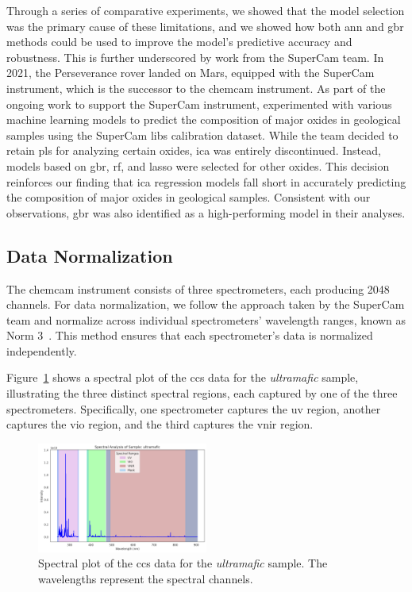 Through a series of comparative experiments, we showed that the model selection was the primary cause of these limitations, and we showed how both \gls{ann} and \gls{gbr} methods could be used to improve the model's predictive accuracy and robustness.
This is further underscored by work from the SuperCam team.
In 2021, the Perseverance rover landed on Mars, equipped with the SuperCam instrument, which is the successor to the \gls{chemcam} instrument.
As part of the ongoing work to support the SuperCam instrument, \citet{andersonPostlandingMajorElement2022} experimented with various machine learning models to predict the composition of major oxides in geological samples using the SuperCam \gls{libs} calibration dataset.
While the team decided to retain \gls{pls} for analyzing certain oxides, \gls{ica} was entirely discontinued.
Instead, models based on \gls{gbr}, \gls{rf}, and \gls{lasso} were selected for other oxides.
This decision reinforces our finding that \gls{ica} regression models fall short in accurately predicting the composition of major oxides in geological samples.
Consistent with our observations, \gls{gbr} was also identified as a high-performing model in their analyses.

\subsection{Data Normalization}\label{sec:data_normalization}
The \gls{chemcam} instrument consists of three spectrometers, each producing 2048 channels.
For data normalization, we follow the approach taken by the SuperCam team and normalize across individual spectrometers' wavelength ranges, known as Norm 3~\cite{andersonPostlandingMajorElement2022}.
This method ensures that each spectrometer's data is normalized independently.

Figure~\ref{fig:spectral_plot} shows a spectral plot of the \gls{ccs} data for the \textit{ultramafic} sample, illustrating the three distinct spectral regions, each captured by one of the three spectrometers. Specifically, one spectrometer captures the \gls{uv} region, another captures the \gls{vio} region, and the third captures the \gls{vnir} region.

\begin{figure}[H]
	\centering
	\includegraphics[width=0.5\textwidth]{images/spectral_plot.png}
	\caption{Spectral plot of the \gls{ccs} data for the \textit{ultramafic} sample. The wavelengths represent the spectral channels.}
	\label{fig:spectral_plot}
\end{figure}

